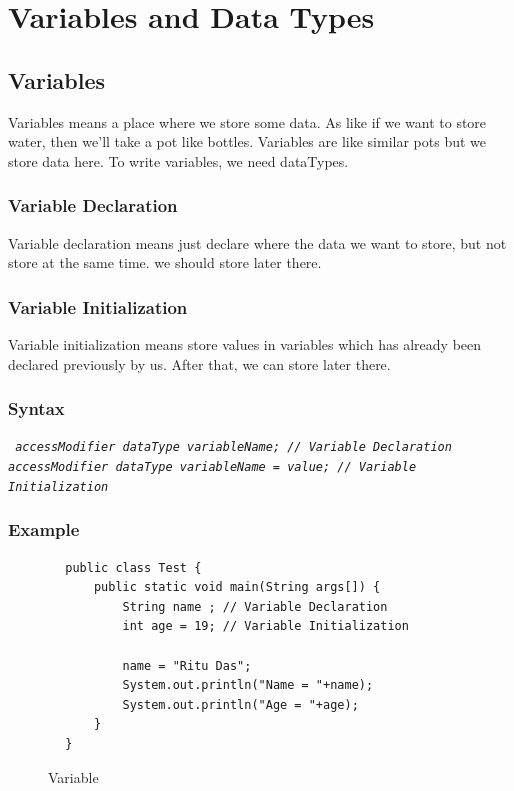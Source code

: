 \documentclass[A4 paper,openany]{book}  %
\begin{document}
\chapter{Variables and Data Types}
% 
% 
\section{Variables}
Variables means a place where we store some data. As like if we want to store water, then we'll take a pot like bottles.
Variables are like similar pots but we store data here. To write variables, we need dataTypes.
% 
%
\subsection{Variable Declaration}
Variable declaration means just declare where the data we want to store, but not store at the same time. we should store later there.
% 
%
\subsection{Variable Initialization}
Variable initialization means store values in variables which has already been declared previously by us. After that, we can store later there.
% 
%
\subsection{Syntax}
\begin{center}
    \tt{
        \textit{accessModifier dataType variableName; // Variable Declaration}\\
        \null\textit{accessModifier dataType variableName = value; // Variable Initialization}
    }
\end{center}
% 
%
\subsection{Example}
\begin{center}
    \begin{verbatim}
        public class Test {
            public static void main(String args[]) {
                String name ; // Variable Declaration
                int age = 19; // Variable Initialization

                name = "Ritu Das";
                System.out.println("Name = "+name);
                System.out.println("Age = "+age);
            }
        }
    \end{verbatim}
\end{center}
% 
% 
\begin{figure}[htbp]
    \begin{center}
        \quad\quad{}
        \caption{Variable\cite{Ref3}}
    \end{center}
\end{figure}
% 
%
\end{document}
